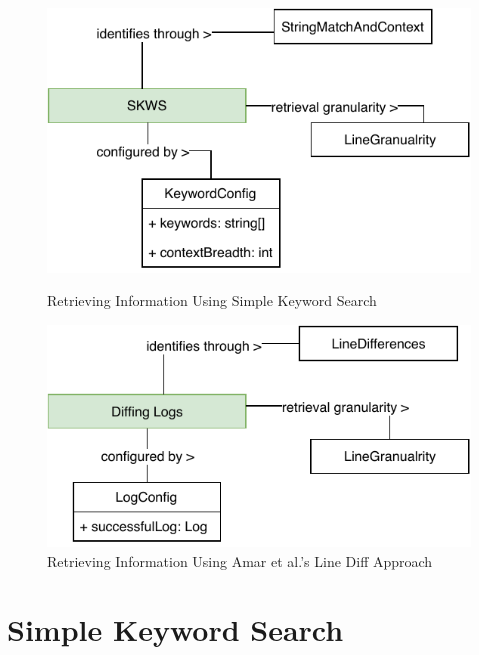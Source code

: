 \documentclass[\myrootdir/main.tex]{subfiles}
\begin{document}
\begin{figure}[hp]
	\centering
	\begin{minipage}{0.45\textwidth}
		\centering
		\includegraphics[width=\textwidth, clip]{img/skws-technique.pdf}
		\caption{Retrieving Information Using Simple Keyword Search}
		\label{fig:keword-search-explanation}
	\end{minipage}\hfill
	\begin{minipage}{0.45\textwidth}
		\centering
		\includegraphics[width=\textwidth, clip]{img/diff-technique.pdf}
		\caption{Retrieving Information Using Amar et al.'s Line Diff Approach}
		\label{fig:diff-technique-model}
	\end{minipage}
\end{figure}

\section{Simple Keyword Search}
\end{document}
